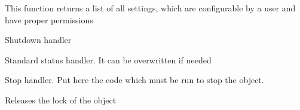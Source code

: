 \documentclass[letterpaper,10pt,english]{sphinxmanual}
\begin{document}
\begin{fulllineitems}
\begin{fulllineitems}
\end{fulllineitems}


\begin{fulllineitems}
\label{command:pyfrid.core.command.BaseCommand.settings}
This function returns a list of all settings, which are configurable by a user and
have proper permissions

\end{fulllineitems}


\begin{fulllineitems}
\label{command:pyfrid.core.command.BaseCommand.shutdown}
Shutdown handler

\end{fulllineitems}


\begin{fulllineitems}
\label{command:pyfrid.core.command.BaseCommand.status}
Standard status handler. It can be overwritten if needed

\end{fulllineitems}


\begin{fulllineitems}
\label{command:pyfrid.core.command.BaseCommand.stop}
Stop handler. Put here the code which must be run to stop the object.

\end{fulllineitems}


\begin{fulllineitems}
\label{command:pyfrid.core.command.BaseCommand.stopped}
\end{fulllineitems}


\begin{fulllineitems}
\label{command:pyfrid.core.command.BaseCommand.unlock}
Releases the lock of the object


\end{fulllineitems}
\end{fulllineitems}
\end{document}
